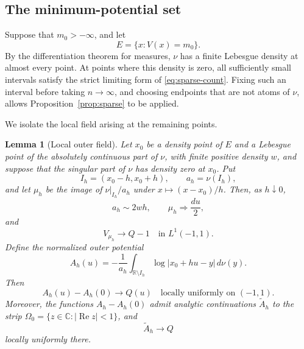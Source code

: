 \documentclass[11pt]{article}
\newtheorem{lemma}[theorem]{Lemma}
\theoremstyle{definition}
\numberwithin{equation}{section}
\newcommand{\R}{\mathbb R}
\newcommand{\C}{\mathbb C}
\begin{document}
\subsection{The minimum-potential set}
\label{subsec:minimum}

Suppose that \(m_0>-\infty\), and let
\[
 E=\{x:V(x)=m_0\}.
\]
By the differentiation theorem for measures, \(\nu\) has a finite
Lebesgue density at almost every point.
At points where this density is zero, all sufficiently small
intervals satisfy the strict limiting form of
\eqref{eq:sparse-count}. Fixing such an interval before taking
\(n\to\infty\), and choosing endpoints that are not atoms of \(\nu\),
allows Proposition~\ref{prop:sparse} to be applied.

We isolate the local field arising at the remaining points.

\begin{lemma}[Local outer field]\label{lem:local-outer-field}
Let \(x_0\) be a density point of \(E\) and a Lebesgue point of the
absolutely continuous part of \(\nu\), with finite positive density
\(w\), and suppose that the singular part of \(\nu\) has density zero
at \(x_0\). Put
\[
 I_h=(x_0-h,x_0+h),\qquad a_h=\nu(I_h),
\]
and let \(\mu_h\) be the image of \(\nu|_{I_h}/a_h\) under
\(x\mapsto(x-x_0)/h\). Then, as \(h\downarrow0\),
\[
 a_h\sim2wh,\qquad \mu_h\Longrightarrow \frac{du}{2},
\]
and
\begin{equation}\label{eq:inner-potential}
 V_{\mu_h}\longrightarrow Q-1
 \quad\text{in }L^1(-1,1).
\end{equation}
Define the normalized outer potential
\[
 A_h(u)=-\frac1{a_h}
 \int_{\R\setminus I_h}\log|x_0+hu-y|\,d\nu(y).
\]
Then
\begin{equation}\label{eq:real-field-limit}
 A_h(u)-A_h(0)\longrightarrow Q(u)
 \quad\text{locally uniformly on }(-1,1).
\end{equation}
Moreover, the functions \(A_h-A_h(0)\) admit analytic continuations
\(\widetilde A_h\) to the strip
\(\Omega_0=\{z\in\C:|\operatorname{Re}z|<1\}\), and
\[
 \widetilde A_h\longrightarrow Q
\]
locally uniformly there.
\end{lemma}
\end{document}
